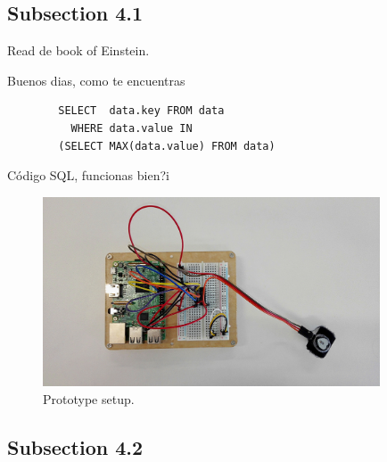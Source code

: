 \documentclass[a4paper,12pt]{article}
\begin{document}


\newpage

\medskip




\clearpage
\newpage
\begin{appendices}
    
    
    
\end{appendices}

\newpage
\subsection{Subsection 4.1}
\label{subsec:subsec4.1}
\lipsum[8]
Read de book \cite{einstein} of Einstein.

Buenos dias, como te encuentras
\begin{listing}[H]
	\begin{verbatim}
		SELECT  data.key FROM data
		  WHERE data.value IN
		(SELECT MAX(data.value) FROM data)
	\end{verbatim}
	\caption{Código SQL, funcionas bien?i}
	\label{listings:como va esto}
\end{listing}




\begin{figure}[H]
\label{fig:prototype1}
\centering
\includegraphics[width=10cm]{img/Chapter4/prototype1_edited.jpg}
\caption[Prototype setup]{\footnotesize{Prototype setup.}}
\end{figure}

\lipsum[14]

\subsection{Subsection 4.2}
\label{subsec:subsec4.2}
\end{document}
